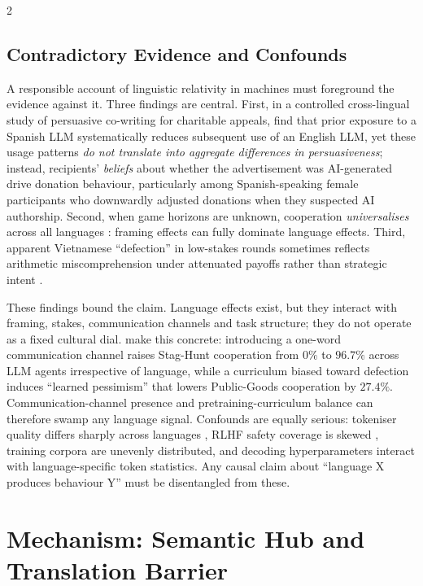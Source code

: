 \documentclass[openacc]{rsproca_new}
\begin{document}
\begin{multicols}{2}
\subsection{Contradictory Evidence and Confounds}
\label{sec:confounds}

A responsible account of linguistic relativity in machines must foreground the evidence against it. Three findings are central. First, in a controlled cross-lingual study of persuasive co-writing for charitable appeals, \citeauthor{biswas2025persuasion} \cite{biswas2025persuasion} find that prior exposure to a Spanish LLM systematically reduces subsequent use of an English LLM, yet these usage patterns \emph{do not translate into aggregate differences in persuasiveness}; instead, recipients' \emph{beliefs} about whether the advertisement was AI-generated drive donation behaviour, particularly among Spanish-speaking female participants who downwardly adjusted donations when they suspected AI authorship. Second, when game horizons are unknown, cooperation \emph{universalises} across all languages \cite{buscemi2025fairgame, lore2024framing}: framing effects can fully dominate language effects. Third, apparent Vietnamese ``defection'' in low-stakes rounds sometimes reflects arithmetic miscomprehension under attenuated payoffs rather than strategic intent \cite{huynh2025fairgame}.

These findings bound the claim. Language effects exist, but they interact with framing, stakes, communication channels and task structure; they do not operate as a fixed cultural dial. \citeauthor{madmoun2025communication} \cite{madmoun2025communication} make this concrete: introducing a one-word communication channel raises Stag-Hunt cooperation from $0\%$ to $96.7\%$ across LLM agents irrespective of language, while a curriculum biased toward defection induces ``learned pessimism'' that lowers Public-Goods cooperation by $27.4\%$. Communication-channel presence and pretraining-curriculum balance can therefore swamp any language signal. Confounds are equally serious: tokeniser quality differs sharply across languages \cite{yong2024lowresource}, RLHF safety coverage is skewed \cite{ouyang2022training, yong2025multilingualsafety}, training corpora are unevenly distributed, and decoding hyperparameters interact with language-specific token statistics. Any causal claim about ``language X produces behaviour Y'' must be disentangled from these.

\section{Mechanism: Semantic Hub and Translation Barrier}
\label{sec:mechanism}


\end{multicols}
\end{document}
